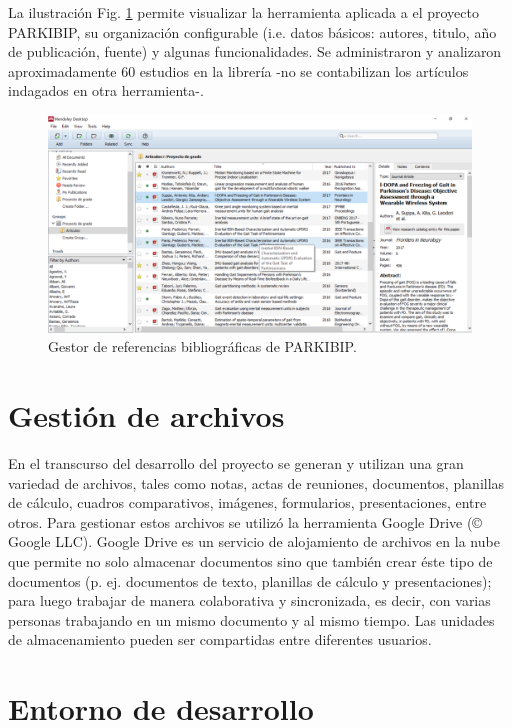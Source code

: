 La ilustración Fig. \ref{fig:admin_references} permite visualizar la herramienta aplicada a el proyecto PARKIBIP, su organización configurable (i.e. datos básicos: autores, titulo, año de publicación, fuente) y algunas funcionalidades. Se administraron y analizaron aproximadamente 60 estudios en la librería -no se contabilizan los artículos indagados en otra herramienta-.

\begin{figure}[H]
\includegraphics[width=\textwidth]{TESIS/imagenes/chap04/Mendeley.png}
\caption{ Gestor de referencias bibliográficas de PARKIBIP.}
\label{fig:admin_references}
\end{figure}

\section{Gestión de archivos}

En el transcurso del desarrollo del proyecto se generan y utilizan una gran variedad de archivos, tales como notas, actas de reuniones, documentos, planillas de cálculo, cuadros comparativos, imágenes, formularios, presentaciones, entre otros. Para gestionar estos archivos se utilizó la herramienta Google Drive (© Google LLC). Google Drive es un servicio de alojamiento de archivos en la nube que permite no solo almacenar documentos sino que también crear éste tipo de documentos (p. ej. documentos de texto, planillas de cálculo y presentaciones); para luego trabajar de manera colaborativa y sincronizada, es decir, con varias personas trabajando en un mismo documento y al mismo tiempo. Las unidades de almacenamiento pueden ser compartidas entre diferentes usuarios.

\section{Entorno de desarrollo}

